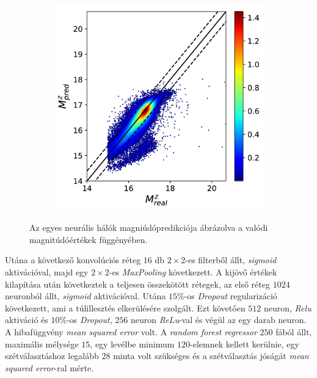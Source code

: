 \documentclass[12pt,letterpaper,twoside,openright]{book}
\begin{document}
\begin{figure}[]
\begin{subfigure}[b]{0.3\textwidth}
    \label{fig:2}
    \hspace{0cm}
  \end{subfigure}
   \begin{subfigure}[b]{0.3\textwidth}
    \includegraphics[width=\textwidth, height = \textwidth]{Figures/pmz3.png}
    \label{fig:2}
    
  \end{subfigure}

\caption{Az egyes neurális hálók magniúdópredikciója ábrázolva a valódi magnitúdóértékek függényében.}
\label{mags}
\end{figure}
 Utána a következő konvolúciós réteg $16$ db $2\times 2$-es filterből állt,  \textit{sigmoid} aktivációval, majd egy $2\times 2$-es \textit{MaxPooling} következett. A kijövő értékek kilapítása után következtek a teljesen összekötött rétegek, az első réteg $1024$ neuronból állt, \textit{sigmoid} aktivációval. Utána  $15\%$-os \textit{Dropout} regularizáció következett, ami a túlillesztés elkerülésére szolgált. Ezt követően $512$ neuron, \textit{Relu} aktiváció és $10\%$-os \textit{Dropout}, $256$ neuron \textit{ReLu}-val és végül az egy darab neuron. A hibafüggvény \textit{mean squared error} volt. A \textit{random forest regressor} $250$ fából állt, maximális mélysége $15$, egy levélbe minimum $120$-elemnek kellett kerülnie, egy szétválasztáshoz legalább $28$ minta volt szükséges és a szétválasztás jóságát \textit{mean squared error}-ral mérte. \newline\indent
\end{document}
